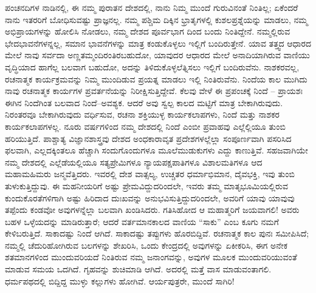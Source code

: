 ಪಂಚನದಿಗಳ ನಾಡಿನಲ್ಲಿ, ಈ ನಮ್ಮ ಪುರಾತನ ದೇಶದಲ್ಲಿ, ನಾನು ನಿಮ್ಮ ಮುಂದೆ ಗುರುವಿನಂತೆ ನಿಂತಿಲ್ಲ; ಏಕೆಂದರೆ ನಾನು ಇತರರಿಗೆ ಬೋಧಿಸುವಷ್ಟು ಪ್ರಾಜ್ಞನಲ್ಲ. ನಮ್ಮ ಪಶ್ಚಿಮ ದಿಕ್ಕಿನ ಭ್ರಾತೃಗಳಲ್ಲಿ ಕುಶಲಪ್ರಶ್ನೆಯನ್ನು ಮಾಡಲು, ನಮ್ಮ ಅಭಿಪ್ರಾಯಗಳನ್ನು ಹೋಲಿಸಿ ನೋಡಲು, ನಮ್ಮ ದೇಶದ ಪೂರ್ವಭಾಗ ದಿಂದ ಬಂದು ನಿಂತಿದ್ದೇನೆ. ನಮ್ಮಲ್ಲಿರುವ ಭೇದಭಾವನೆಗಳನ್ನಲ್ಲ, ಸಮಾನ ಭಾವನೆಗಳನ್ನು ಮಾತ್ರ ಕಂಡುಕೊಳ್ಳಲು ಇಲ್ಲಿಗೆ ಬಂದಿರುತ್ತೇನೆ. ಯಾವ ತತ್ತ್ವದ ಆಧಾರದ ಮೇಲೆ ನಾವು ಸರ್ವದಾ ಅಣ್ಣತಮ್ಮಂದಿರಂತಿರಬಹುದೋ, ಯಾವುದರ ಆಧಾರದ ಮೇಲೆ ಅನಾದಿಯಾಗಿರುವ ವಾಣಿಯು ವೃದ್ಧಿಯಾದ ಹಾಗೆಲ್ಲ ಬಲವಾಗ ಬಹುದೋ, ಅದನ್ನು ತಿಳಿದುಕೊಳ್ಳಲೆತ್ನಿಸಲು ಇಲ್ಲಿಗೆ ಬಂದಿರುವೆನು. ನಾಶಕರವಲ್ಲ, ರಚನಾತ್ಮಕ ಕಾರ್ಯಕ್ರಮವನ್ನು ನಿಮ್ಮ ಮುಂದಿಡುವ ಪ್ರಯತ್ನ ಮಾಡಲು ಇಲ್ಲಿ ನಿಂತಿರುವೆನು. ನಿಂದೆಯ ಕಾಲ ಮುಗಿದು ನಾವು ರಚನಾತ್ಮಕ ಕಾರ್ಯಗಳ ಪ್ರವರ್ತನೆಯನ್ನು ನಿರೀಕ್ಷಿಸುತ್ತಿದ್ದೇವೆ. ಕೆಲವು ವೇಳೆ ಈ ಪ್ರಪಂಚಕ್ಕೆ ನಿಂದೆ – ಪ್ರಾಯಶಃ ಈಗಿನ ನಿಂದೆಗಿಂತ ಬಲವಾದ ನಿಂದೆ–ಅವಶ್ಯಕ. ಆದರೆ ಅವು ಸ್ವಲ್ಪ ಕಾಲದ ಮಟ್ಟಿಗೆ ಮಾತ್ರ ಬೇಕಾಗಿರುವುದು. ನಿರಂತರವೂ ಬೇಕಾಗಿರುವುದು ವರ್ಧಿಸುವ, ರಚನಾ ಶಕ್ತಿಯುಳ್ಳ ಕಾರ್ಯಕಲಾಪಗಳು, ನಿಂದೆ ಮತ್ತು ನಾಶಕರ ಕಾರ್ಯಕಲಾಪಗಳಲ್ಲ. ನೂರು ವರ್ಷಗಳಿಂದ ನಮ್ಮ ದೇಶದಲ್ಲಿ ನಿಂದೆ ಎಂಬೀ ಪ್ರವಾಹವು ಎಲ್ಲೆಲ್ಲಿಯೂ ತುಂಬಿ ಹರಿಯುತ್ತಿದೆ. ಪಾಶ್ಚಾತ್ಯ ವಿಜ್ಞಾನಶಾಸ್ತ್ರವು ದೇಶದ ಅಂಧಕಾರಾವೃತ ಪ್ರದೇಶಗಳಲ್ಲೆಲ್ಲಾ ಸಂಪೂರ್ಣವಾಗಿ ಪಸರಿಸಿದ ಫಲವಾಗಿ, ಎಲ್ಲದಕ್ಕಿಂತಲೂ ಹೆಚ್ಚಾಗಿ ಸಂದುಗೊಂದುಗಳೂ ಮೂಲೆಮುಡುಕುಗಳು ಎದ್ದು ಕಾಣುತ್ತಿವೆ. ಸಹಜವಾಗಿಯೇ ನಮ್ಮ ದೇಶದಲ್ಲಿ ಎಲ್ಲೆಡೆಯಲ್ಲಿಯೂ ಸತ್ಯಪ್ರೇಮಿಗಳೂ ನ್ಯಾಯಪಕ್ಷಪಾತಿಗಳೂ ವಿಶಾಲಮತಿಗಳೂ ಆದ ಮಹಾಮಹಿಮರು ಜನ್ಮವೆತ್ತಿದರು. ಇವರಲ್ಲಿ ದೇಶ ವಾತ್ಸಲ್ಯ, ಉಚ್ಚತರ ಧರ್ಮಾಭಿಮಾನ, ದೈವಭಕ್ತಿ, ಇವು ತುಂಬಿ ತುಳುಕುತ್ತಿದ್ದುವು. ಈ ಮಹನೀಯರಿಗೆ ಅಷ್ಟು ಪ್ರೇಮವಿದ್ದುದರಿಂದಲೇ, ಇವರು ತಮ್ಮ ಮಾತೃಭೂಮಿಯಲ್ಲಿರುವ ಕುಂದುಕೊರತೆಗಳಿಗಾಗಿ ಅಷ್ಟು ಹಿರಿದಾದ ದುಃಖವನ್ನು ಅನುಭವಿಸುತ್ತಿದ್ದುದರಿಂದಲೇ, ಅವರಿಗೆ ಯಾವು ಯಾವುವು ತಪ್ಪೆಂದು ಕಂಡವೋ ಅವುಗಳನ್ನೆಲ್ಲಾ ಬಲವಾಗಿ ಖಂಡಿಸಿದರು. ಗತಿಸಿಹೋದ ಆ ಮಹಾತ್ಮರಿಗೆ ಜಯವಾಗಲಿ! ಅವರು ಬಹಳ ಒಳ್ಳೆಯದನ್ನು ಮಾಡಿರುತ್ತಾರೆ; ಆದರೆ ವರ್ತಮಾನಕಾಲದ ವಾಣಿಯ “ಸಾಕು” ಎಂಬ ಕೂಗು ನಮಗೆ ಕೇಳಿಬರುತ್ತಿದೆ. ಸಾಕಾದಷ್ಟು ನಿಂದೆ ಆಗಿದೆ. ಸಾಕಾದಷ್ಟು ತಪ್ಪುಗಳು ಹೊರಬಿದ್ದಿವೆ. ರಚನಾತ್ಮಕ ಕಾಲ ಪುನಃ ಸಮೀಪಿಸಿದೆ; ನಮ್ಮಲ್ಲಿ ಚೆದುರಿಹೋಗಿರುವ ಬಲಗಳನ್ನು ಶೇಖರಿಸಿ, ಒಂದು ಕೇಂದ್ರದಲ್ಲಿ ಅವುಗಳನ್ನು ಏಕೀಕರಿಸಿ, ಈಗ ಅನೇಕ ಶತಮಾನಗಳಿಂದ ಮುಂದುವರಿಯದೆ ನಿಂತಿರುವ ನಮ್ಮ ಜನಾಂಗವನ್ನು, ಅವುಗಳ ಮೂಲಕ ಮುಂದುವರಿಯುವಂತೆ ಮಾಡುವ ಸಮಯ ಒದಗಿದೆ. ಗೃಹವನ್ನು ಶುಚಿಮಾಡಿ ಆಗಿದೆ. ಅದರಲ್ಲಿ ಮತ್ತೆ ವಾಸ ಮಾಡುವಂತಾಗಲಿ. ಧರ್ಮಪಥದಲ್ಲಿ ಬಿದ್ದಿದ್ದ ಮುಳ್ಳು ಕಲ್ಲುಗಳು ಹೋಗಿವೆ. ಆರ್ಯಪುತ್ರರೇ, ಮುಂದೆ ಸಾಗಿರಿ!

